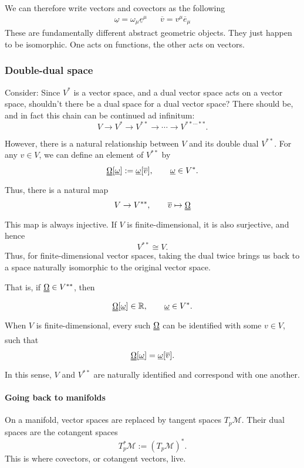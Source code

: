 		We can therefore write vectors and covectors as the following
		\begin{align*}
			\underline{\omega} = \omega_\mu \underline{e}^\mu &&
			\overline{v} = v^\mu \overline{e}_\mu
		\end{align*}
		These are fundamentally different abstract geometric objects. They just happen to be isomorphic.
		One acts on functions, the other acts on vectors. 

	\subsubsection{Double-dual space}
		Consider: Since $V^*$ is a vector space, and a dual vector space acts on a vector space, shouldn't there be a dual space for a dual vector space? 
		There should be, and in fact this chain can be continued ad infinitum:
		\[
			V \to V^* \to V^{**} \to \cdots \to V^{**\cdots**}.
		\]

		However, there is a natural relationship between $V$ and its double dual $V^{**}$. For any $v\in V$, we can 
		define an element of $V^{**}$ by
		\[
			\uuline{\Omega} [\underline \omega] := \underline\omega[\overline v],
			\qquad \underline\omega\in V^*.
		\]
		Thus, there is a natural map
		\[
			V \to V^{**},
			\qquad
			\overline v \mapsto \uuline{\Omega}
		\]
		This map is always injective. If $V$ is finite-dimensional, 
		it is also surjective, and hence
		\[
			V^{**}\cong V.
		\]
		Thus, for finite-dimensional vector spaces, taking the 
		dual twice brings us back to a space naturally isomorphic 
		to the original vector space.

		That is, if $\uuline{\Omega}\in V^{**}$, then
		\[
			\uuline{\Omega}[\underline\omega]\in\mathbb R,
			\qquad \underline\omega \in V^*.
		\]
		When $V$ is finite-dimensional, every such $\uuline\Omega$ can be 
		identified with some $v\in V$, such that
		\begin{equation}
			\label{eq:double-dual-vector-congruency}
			\uuline{\Omega}[\underline\omega]=\underline\omega[\overline v].
		\end{equation}
		In this sense, $V$ and $V^{**}$ are naturally identified and correspond with one another.

		\paragraph{Going back to manifolds}

		On a manifold, vector spaces are replaced by tangent spaces
		$T_p\mathcal M$. Their dual spaces are the cotangent spaces
		\[
			T_p^*\mathcal M := (T_p\mathcal M)^*.
		\]
		This is where covectors, or cotangent vectors, live.

